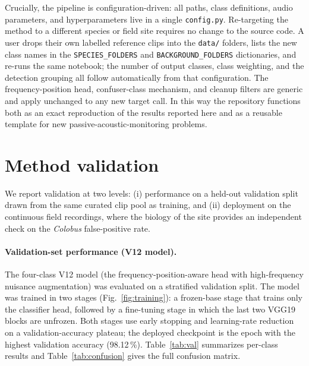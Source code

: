 \documentclass[final,3p,times]{elsarticle}
\begin{document}
Crucially, the pipeline is configuration-driven: all paths, class
definitions, audio parameters, and hyperparameters live in a single
\texttt{config.py}. Re-targeting the method to a different species or field site
requires no change to the source code. A user drops their own labelled reference
clips into the \texttt{data/} folders, lists the new class names in the
\texttt{SPECIES\_FOLDERS} and \texttt{BACKGROUND\_FOLDERS} dictionaries, and
re-runs the same notebook; the number of output classes, class weighting, and
the detection grouping all follow automatically from that configuration. The
frequency-position head, confuser-class mechanism, and cleanup filters are
generic and apply unchanged to any new target call. In this way the repository
functions both as an exact reproduction of the results reported here and as a
reusable template for new passive-acoustic-monitoring problems.

\section*{Method validation}

We report validation at two levels: (i) performance on a held-out validation
split drawn from the same curated clip pool as training, and (ii) deployment on
the continuous field recordings, where the biology of the site provides an
independent check on the \textit{Colobus} false-positive rate.

\paragraph{Validation-set performance (V12 model).}
The four-class V12 model (the frequency-position-aware head with
high-frequency nuisance augmentation) was evaluated on a stratified
validation split. The model was trained in two stages
(Fig.~\ref{fig:training}): a frozen-base stage that trains only the
classifier head, followed by a fine-tuning stage in which the last two VGG19
blocks are unfrozen. Both stages use early stopping and learning-rate
reduction on a validation-accuracy plateau; the deployed checkpoint is the
epoch with the highest validation accuracy (98.12\,\%).
Table~\ref{tab:val} summarizes per-class results and
Table~\ref{tab:confusion} gives the full confusion matrix.
\end{document}

